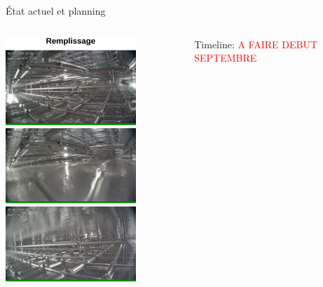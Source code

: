     \begin{frame}{État actuel et planning}
        \begin{columns}
            \begin{column}{0.5\textwidth}
                \includegraphics[width=0.75\textwidth]{./pictures/status_666.png}
            \end{column}
            \begin{column}{0.5\textwidth}
                Timeline:
                \textcolor{red}{A FAIRE DEBUT SEPTEMBRE}
            \end{column}
        \end{columns}
    \end{frame}

